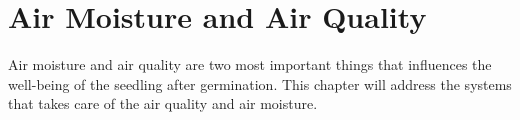 \documentclass[../main]{subfiles}
\begin{document}
\chapter{Air Moisture and Air Quality} \label{chp:}

Air moisture and air quality are two most important things that
influences the well-being of the seedling after germination. This
chapter will address the systems that takes care of the air quality
and air moisture.




\end{document}
